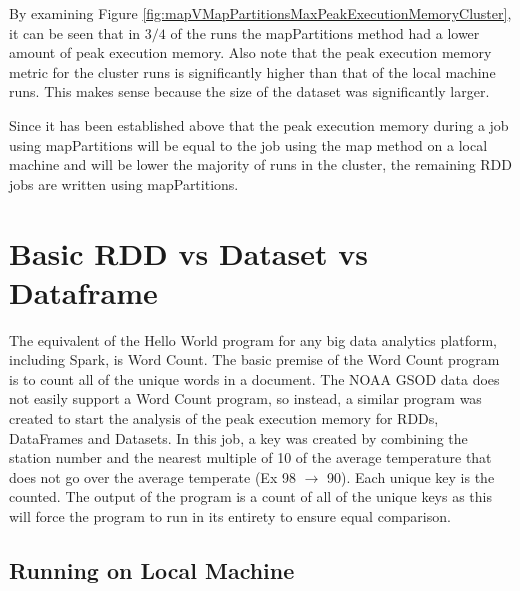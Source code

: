 \documentclass[conference]{IEEEtran}
\begin{document}
By examining Figure \ref{fig:mapVMapPartitionsMaxPeakExecutionMemoryCluster}, it can be seen that in $3/4$ of the runs the mapPartitions method had a lower amount of peak execution memory.
Also note that the peak execution memory metric for the cluster runs is significantly higher than that of the local machine runs.
This makes sense because the size of the dataset was significantly larger.

Since it has been established above that the peak execution memory during a job using mapPartitions will be equal to the job using the map method on a local machine and will be lower the majority of runs in the cluster, the remaining RDD jobs are written using mapPartitions.


\section{Basic RDD vs Dataset vs Dataframe}\label{basicjobs}
The equivalent of the Hello World program for any big data analytics platform, including Spark, is Word Count.
The basic premise of the Word Count program is to count all of the unique words in a document.
The NOAA GSOD data does not easily support a Word Count program, so instead, a similar program was created to start the analysis of the peak execution memory for RDDs, DataFrames and Datasets.
In this job, a key was created by combining the station number and the nearest multiple of 10 of the average temperature that does not go over the average temperate (Ex 98 $\rightarrow$ 90).
Each unique key is the counted.
The output of the program is a count of all of the unique keys as this will force the program to run in its entirety to ensure equal comparison.

\subsection{Running on Local Machine}
\end{document}
